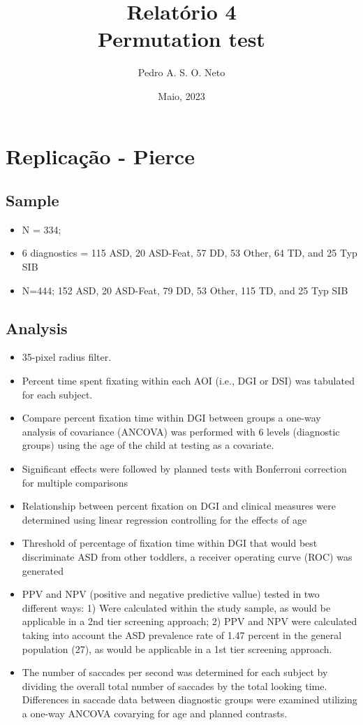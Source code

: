 \documentclass{article}
\title{Relatório 4 \\ Permutation test}
\author{Pedro A. S. O. Neto}
\date{Maio, 2023}
\begin{document}
\maketitle

\section{Replicação - Pierce}

\subsection{Sample}

\begin{itemize}
  \item N = 334; 
  \item 6 diagnostics = 115 ASD, 20 ASD-Feat, 57 DD, 53 Other, 64 TD, and 25 Typ SIB
  \item N=444; 152 ASD, 20 ASD-Feat, 79 DD, 53 Other, 115 TD, and 25 Typ SIB
\end{itemize}

\subsection{Analysis}

\begin{itemize}
  \item 35-pixel radius filter. 
  \item Percent time spent fixating within each AOI (i.e., DGI or DSI) was tabulated for each subject.
  \item Compare percent fixation time within DGI between groups a one-way analysis of covariance (ANCOVA) was performed with 6 levels (diagnostic groups) using the age of the child at testing as a covariate.
  \item Significant effects were followed by planned tests with Bonferroni correction for multiple comparisons
  \item Relationship between percent fixation on DGI and clinical measures were determined using linear regression controlling for the effects of age
  \item Threshold of percentage of fixation time within DGI that would best discriminate ASD from other toddlers, a receiver operating curve (ROC) was generated
  \item PPV and NPV (positive and negative predictive vallue) tested in two different ways: 1) Were calculated within the study sample, as would be applicable in a 2nd tier screening approach; 2) PPV and NPV were calculated taking into account the ASD prevalence rate of 1.47 percent in the general population (27), as would be applicable in a 1st tier screening approach.
  \item The number of saccades per second was determined for each subject by dividing the overall total number of saccades by the total looking time. Differences in saccade data between diagnostic groups were examined utilizing a one-way ANCOVA covarying for age and planned contrasts.
\end{itemize}
\end{document}
